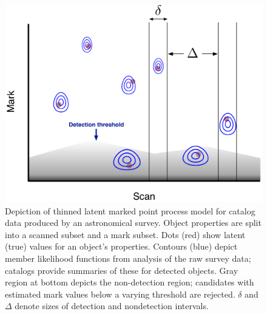 \begin{figure}
\begin{center}
\includegraphics[width=.8\textwidth]{fig/ScanMarkPtProcess-Thin+Err}
\end{center}
\caption{Depiction of thinned latent marked point process model for catalog data produced by an astronomical survey.
Object properties are split into a scanned subset and a mark subset.
Dots (red) show latent (true) values for an object's properties.
Contours (blue) depict member likelihood functions from analysis of the raw survey data; catalogs provide summaries of these for detected objects.
Gray region at bottom depicts the non-detection region; candidates with estimated mark values below a varying threshold are rejected.
$\delta$ and $\Delta$ denote sizes of detection and nondetection intervals.}
\label{fig:ScanMark}
\end{figure}

